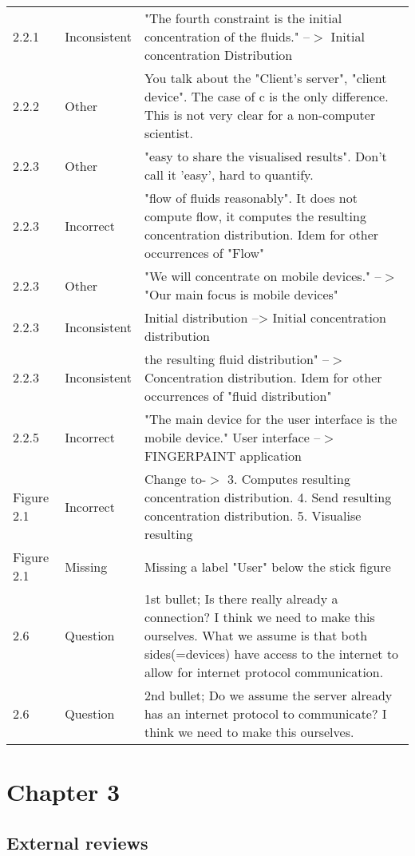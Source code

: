 \begin{longtable}{l|l|p{}}
2.2.1 & Inconsistent & "The fourth constraint is the initial concentration of the  fluids." --$>$ Initial concentration Distribution \\
2.2.2 & Other & You talk about the "Client's server", "client device". The case of c is the only difference. This is not very clear for a non-computer scientist.\\
2.2.3 & Other & "easy to share the visualised results". Don't call it 'easy', hard to quantify.\\
2.2.3 & Incorrect & "flow of fluids reasonably". It does not compute flow, it computes the resulting concentration distribution. Idem for other occurrences of "Flow"\\
2.2.3 & Other & "We will concentrate on mobile devices." --$>$ "Our main focus is mobile devices"\\
2.2.3 & Inconsistent & Initial distribution --> Initial concentration distribution\\
2.2.3 & Inconsistent & the resulting fluid distribution" --$>$ Concentration distribution. Idem for other occurrences of "fluid distribution"\\
2.2.5 & Incorrect & "The main device for the user interface is the mobile device." User interface --$>$ FINGERPAINT application\\
Figure 2.1 & Incorrect & Change to-$>$ 3. Computes resulting concentration distribution. 4. Send resulting concentration distribution. 5. Visualise resulting\\
Figure 2.1 & Missing & Missing a label "User" below the stick figure\\
2.6 & Question & 1st bullet; Is there really already a connection? I think we need to make this ourselves. What we assume is that both sides(=devices) have access to the internet to allow for internet protocol communication.\\
2.6 & Question & 2nd bullet; Do we assume the server already has an internet protocol to communicate? I think we need to make this ourselves.\\
\end{longtable}

\section{Chapter 3}
\subsection{External reviews}
